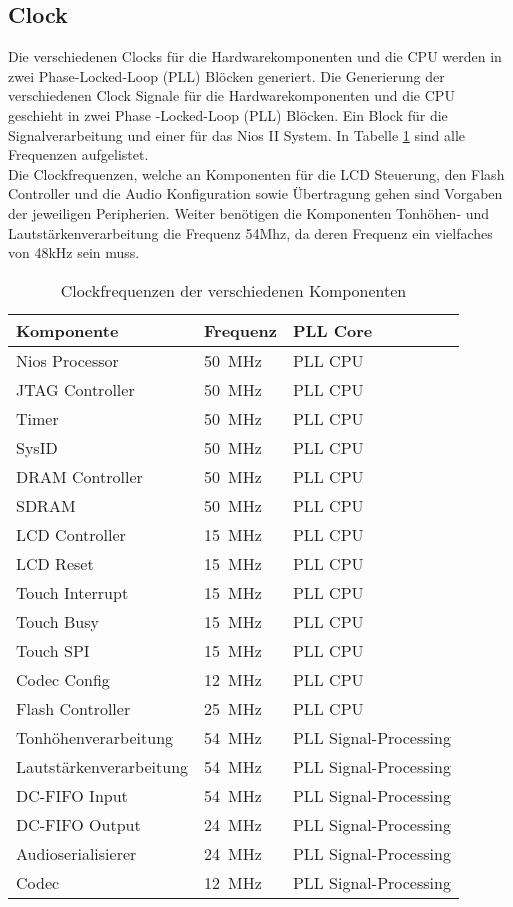 \subsection{Clock}\label{subsec:Clock}
Die verschiedenen Clocks für die Hardwarekomponenten und die CPU werden in zwei Phase-Locked-Loop (PLL) Blöcken generiert. Die Generierung der verschiedenen Clock Signale für die Hardwarekomponenten und die CPU geschieht in zwei Phase -Locked-Loop (PLL) Blöcken. Ein Block für die Signalverarbeitung und einer für das Nios II System. In Tabelle \ref{tab:clocks} sind alle Frequenzen aufgelistet. \\
Die Clockfrequenzen, welche an Komponenten für die LCD Steuerung, den Flash Controller und die Audio Konfiguration sowie Übertragung gehen sind Vorgaben der jeweiligen Peripherien. Weiter benötigen die Komponenten Tonhöhen- und Lautstärkenverarbeitung die Frequenz 54Mhz, da deren Frequenz ein vielfaches von 48kHz sein muss.

\begin{table}[H]
	\centering
	\caption{Clockfrequenzen der verschiedenen Komponenten}
	\label{tab:clocks}
	\begin{tabular}{l|l|l}
		\textbf{Komponente} & \textbf{Frequenz} & \textbf{PLL Core} \\
		\hline\hline
		Nios Processor & \SI{50}{MHz} & PLL CPU  \\ \hline
		JTAG Controller & \SI{50}{MHz} & PLL CPU \\ \hline
		Timer & \SI{50}{MHz} & PLL CPU \\ \hline
		SysID & \SI{50}{MHz} & PLL CPU \\ \hline
		DRAM Controller & \SI{50}{MHz} & PLL CPU \\ \hline
		SDRAM & \SI{50}{MHz} & PLL CPU \\ \hline
		LCD Controller & \SI{15}{MHz} & PLL CPU \\ \hline
		LCD Reset & \SI{15}{MHz} & PLL CPU \\ \hline
		Touch Interrupt & \SI{15}{MHz} & PLL CPU \\ \hline
		Touch Busy & \SI{15}{MHz} & PLL CPU \\ \hline
		Touch SPI & \SI{15}{MHz} & PLL CPU \\ \hline
		Codec Config & \SI{12}{MHz} & PLL CPU \\ \hline
		Flash Controller & \SI{25}{MHz} & PLL CPU \\ \hline
		Tonhöhenverarbeitung & \SI{54}{MHz} & PLL Signal-Processing \\ \hline
		Lautstärkenverarbeitung & \SI{54}{MHz} & PLL Signal-Processing \\ \hline
		DC-FIFO Input	& \SI{54}{MHz} & PLL Signal-Processing \\ \hline
		DC-FIFO Output	& \SI{24}{MHz} & PLL Signal-Processing \\ \hline
	 	Audioserialisierer	& \SI{24}{MHz} & PLL Signal-Processing \\ \hline
	 	Codec	& \SI{12}{MHz} & PLL Signal-Processing \\ \hline
		
	\end{tabular}
\end{table}
